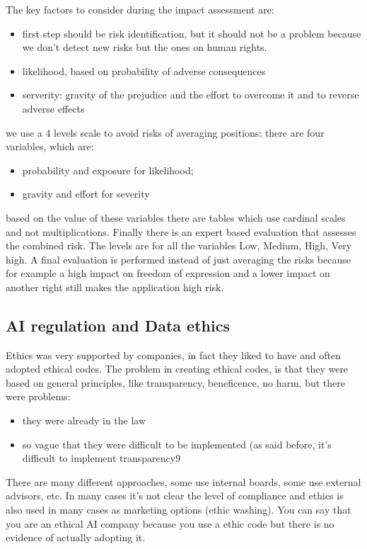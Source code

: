 The key factors to consider during the impact assessment are:
\begin{itemize} 
    \item first step should be risk identification, but it should not be a problem because we don't detect new risks but the ones on human rights.
    \item likelihood, based on probability of adverse consequences
    \item serverity: gravity of the prejudice and the effort to overcome it and to reverse adverse effects
\end{itemize}
we use a 4 levels scale to avoid risks of averaging positions:
there are four variables, which are:
\begin{itemize}
    \item probability and exposure for likelihood;
    \item gravity and effort for severity
\end{itemize}
based on the value of these variables there are tables which use cardinal scales and not multiplications. Finally there is an expert based evaluation that assesses the combined risk. The levels are for all the variables Low, Medium, High, Very high. 
A final evaluation is performed instead of just averaging the risks because for example a high impact on freedom of expression and a lower impact on another right still makes the application high risk.

\subsection{AI regulation and Data ethics}
Ethics was very supported by companies, in fact they liked to have and often adopted ethical codes. The problem in creating ethical codes, is that they were based on general principles, like transparency, beneficence, no harm, but there were problems:
\begin{itemize}
    \item they were already in the law
    \item so vague that they were difficult to be implemented (as said before, it's difficult to implement transparency9
\end{itemize}

There are many different approaches, some use internal boards, some use external advisors, etc.
In many cases it's not clear the level of compliance and ethics is also used in many cases as marketing options (ethic washing). You can say that you are an ethical AI company because you use a ethic code but there is no evidence of actually adopting it.

